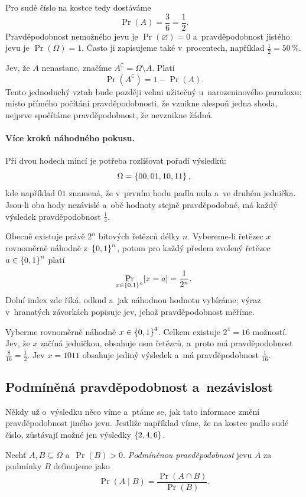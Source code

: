 Pro sudé číslo na kostce tedy dostáváme
\[
    \Pr(A)=\frac{3}{6}=\frac{1}{2}.
\]
Pravděpodobnost nemožného jevu je $\Pr(\varnothing)=0$ a~pravděpodobnost jistého jevu je $\Pr(\Omega)=1$. Často ji zapisujeme také v~procentech, například $\frac{1}{2}=50\,\%$.

Jev, že $A$ nenastane, značíme $A^\complement=\Omega\setminus A$. Platí
\[
    \Pr(A^\complement)=1-\Pr(A).
\]
Tento jednoduchý vztah bude později velmi užitečný u~narozeninového paradoxu: místo přímého počítání pravděpodobnosti, že vznikne alespoň jedna shoda, nejprve spočítáme pravděpodobnost, že nevznikne žádná.

\paragraph{Více kroků náhodného pokusu.}

Při dvou hodech mincí je potřeba rozlišovat pořadí výsledků:
\[
    \Omega=\left\{00,01,10,11\right\},
\]
kde například $01$ znamená, že v~prvním hodu padla nula a~ve druhém jednička. Jsou-li oba hody nezávislé a~obě hodnoty stejně pravděpodobné, má každý výsledek pravděpodobnost $\frac{1}{4}$.

Obecně existuje právě $2^n$ bitových řetězců délky $n$. Vybereme-li řetězec $x$ rovnoměrně náhodně z~$\left\{0,1\right\}^{n}$, potom pro každý předem zvolený řetězec $a\in\left\{0,1\right\}^{n}$ platí
\[
    \Pr_{x\in\left\{0,1\right\}^{n}}[x=a]=\frac{1}{2^n}.
\]
Dolní index zde říká, odkud a~jak náhodnou hodnotu vybíráme; výraz v~hranatých závorkách popisuje jev, jehož pravděpodobnost měříme.

\begin{example}
    Vyberme rovnoměrně náhodně $x\in\left\{0,1\right\}^{4}$. Celkem existuje $2^4=16$ možností. Jev, že $x$ začíná jedničkou, obsahuje osm řetězců, a~proto má pravděpodobnost $\frac{8}{16}=\frac{1}{2}$. Jev $x=1011$ obsahuje jediný výsledek a~má pravděpodobnost $\frac{1}{16}$.
\end{example}

\subsection{Podmíněná pravděpodobnost a~nezávislost}

Někdy už o~výsledku něco víme a~ptáme se, jak tato informace změní pravděpodobnost jiného jevu. Jestliže například víme, že na kostce padlo sudé číslo, zůstávají možné jen výsledky $\left\{2,4,6\right\}$.

\begin{definition}
    Nechť $A,B\subseteq\Omega$ a~$\Pr(B)>0$. \emph{Podmíněnou pravděpodobnost} jevu $A$ za podmínky $B$ definujeme jako
    \[
        \Pr(A\mid B)=\frac{\Pr(A\cap B)}{\Pr(B)}.
    \]
\end{definition}

